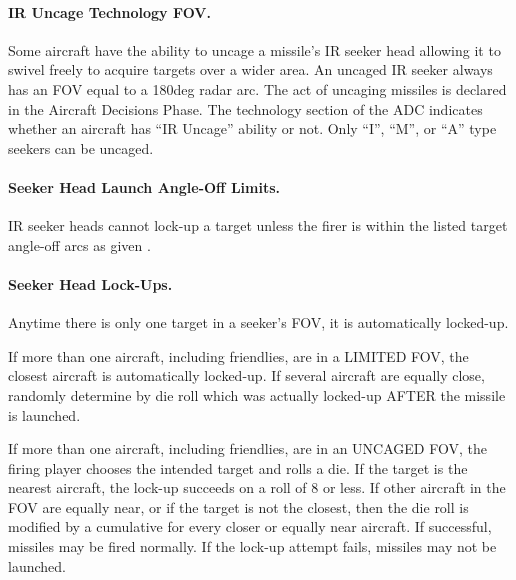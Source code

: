 \paragraph{IR Uncage Technology FOV.} \label{rule:ir-uncage} Some aircraft have the ability to uncage a missile's IR seeker head allowing it to swivel freely to acquire targets over a wider area. An uncaged IR seeker always has an FOV equal to a 180{deg} radar arc. The act of uncaging missiles is declared in the Aircraft Decisions Phase. The technology section of the ADC indicates whether an aircraft has “IR Uncage” ability or not. Only “I”, “M”, or “A” type seekers can be uncaged.


\paragraph{Seeker Head Launch Angle-Off Limits.} IR seeker heads cannot lock-up a target unless the firer is within the listed target angle-off arcs as given .


\paragraph{Seeker Head Lock-Ups.} Anytime there is only one target in a seeker's FOV, it is automatically locked-up.

If more than one aircraft, including friendlies, are in a LIMITED FOV, the closest aircraft is automatically locked-up. If several aircraft are equally close, randomly determine by die roll which was actually locked-up AFTER the missile is launched.

If more than one aircraft, including friendlies, are in an UNCAGED FOV, the firing player chooses the intended target and rolls a die. If the target is the nearest aircraft, the lock-up succeeds on a roll of 8 or less. If other aircraft in the FOV are equally near, or if the target is not the closest, then the die roll is modified by a cumulative  for every closer or equally near aircraft. If successful, missiles may be fired normally. If the lock-up attempt fails, missiles may not be launched. 

